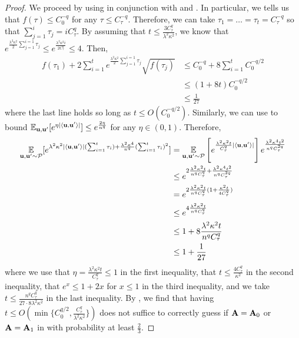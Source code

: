 \begin{proof}
We proceed by using  in conjunction with  and .
In particular, we  tells us that \(f(\tau) \leq C_0^{-q}\) for any \(\tau \leq C_\tau^{-q}\).
Therefore, we can take \(\tau_1=\ldots=\tau_t = C_\tau^{-q}\) so that \(\sum_{j=1}^i \tau_j = i C_\tau^q\).
By assuming that \(t \leq \frac{3 C_\tau^q}{\lambda^2 \kappa^2}\), we know that \(e^{\frac{\lambda^2\kappa^2}{2} \sum_{j=1}^{i=1}\tau_j} \leq e^{\frac{\lambda^2 \kappa^2 i}{2C_\tau^q}} \leq 4\).
Then,
\begin{align*}
    f(\tau_1) + 2\sum_{i=1}^t e^{\frac{\lambda^2\kappa^2}{2} \sum_{j=1}^{i=1}\tau_j} \sqrt{f(\tau_j)}
    &\leq C_0^{-q} + 8 \sum_{i=1}^t C_0^{-q/2} \\
    &\leq (1+8t)C_0^{-q/2} \\
    &\leq \frac1{27}
\end{align*}
where the last line holds so long as \(t \leq O(C_0^{-q/2})\).
Similarly, we can use  to bound
\(
    \operatorname*{\mathbb{E}}_{\boldsymbol{\mathrm{u}},\boldsymbol{\mathrm{u}}'}[e^{\eta |\langle \boldsymbol{\mathrm{u}}, \boldsymbol{\mathrm{u}}'\rangle|}]
    \leq e^{\frac{2\eta}{n^q}}
\)
for any \(\eta \in (0,1)\).
Therefore,
\begin{align*}
    \operatorname*{\mathbb{E}}_{\boldsymbol{\mathrm{u}},\boldsymbol{\mathrm{u}}'\sim{\mathcal P}}[e^{\lambda^2 \kappa^2|\langle \boldsymbol{\mathrm{u}}, \boldsymbol{\mathrm{u}}'\rangle|(\sum_{i=1}^t \tau_i) + \frac{\lambda^2\kappa^4}{n^q}(\sum_{i=1}^t \tau_i)^2}]
    &= \operatorname*{\mathbb{E}}_{\boldsymbol{\mathrm{u}},\boldsymbol{\mathrm{u}}'\sim{\mathcal P}}\left[e^{\frac{\lambda^2 \kappa^2 t}{C_\tau^q}|\langle \boldsymbol{\mathrm{u}}, \boldsymbol{\mathrm{u}}'\rangle|}\right] e^{ \frac{\lambda^2\kappa^4 t^2}{n^q C_\tau^{2q}}} \\
    &\leq e^{2\frac{\lambda^2 \kappa^2 t}{n^q C_\tau^q} + \frac{\lambda^2\kappa^4 t^2}{n^q C_\tau^{2q}}} \\
    &= e^{2\frac{\lambda^2 \kappa^2 t}{n^q C_\tau^q}(1 + \frac{\kappa^2 t}{4C_\tau^q})} \\
    &\leq e^{4\frac{\lambda^2 \kappa^2 t}{n^q C_\tau^q}} \\
    &\leq 1 + 8\frac{\lambda^2 \kappa^2 t}{n^q C_\tau^q} \\
    &\leq 1 + \frac{1}{27}
\end{align*}
where we use that \(\eta = \frac{\lambda^2 \kappa^2 t}{C_\tau^q} \leq 1\) in the first inequality, that \(t \leq \frac{4 C_\tau^q}{\kappa^2}\) in the second inequality, that \(e^x \leq 1+2x\) for \(x \leq 1\) in the third inequality, and we take \(t \leq \frac{n^q C_\tau^q}{27 \cdot 8 \lambda^2 \kappa^2}\) in the last inequality.
By , we find that having \(t \leq O(\min\{C_0^{q/2}, \frac{C_\tau^q}{\lambda^2\kappa^2}\})\) does not suffice to correctly guess if \(\mathbf{A} = \mathbf{A}_0\) or \(\mathbf{A} = \mathbf{A}_1\) in  with probability at least \(\frac23\).
\end{proof}

